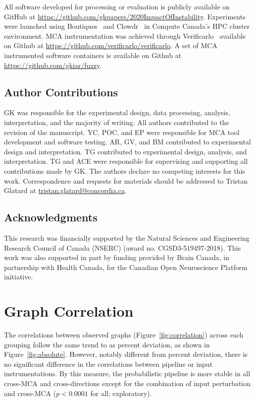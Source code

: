 \documentclass[fleqn,10pt]{SelfArx} %
\begin{document}
All software developed for processing or evaluation is publicly available on GitHub at
\url{https://github.com/gkpapers/2020ImpactOfInstability}. Experiments were launched using
Boutiques~\cite{Glatard2018-tu} and Clowdr~\cite{Kiar2019-sr} in Compute Canada's HPC cluster environment. MCA
instrumentation was achieved through Verificarlo~\cite{Denis2016-wo} available on Github at
\url{https://github.com/verificarlo/verificarlo}. A set of MCA instrumented software containers is available on Github
at \url{https://github.com/gkiar/fuzzy}.


\subsection*{Author Contributions}
GK was responsible for the experimental design, data processing, analysis, interpretation, and the majority of writing.
All authors contributed to the revision of the manuscript. YC, POC, and EP were responsible for MCA tool development
and software testing. AR, GV, and BM contributed to experimental design and interpretation. TG contributed to
experimental design, analysis, and interpretation. TG and ACE were responsible for supervising and supporting all
contributions made by GK. The authors declare no competing interests for this work. Correspondence and requests for
materials should be addressed to Tristan Glatard at \url{tristan.glatard@concordia.ca}.

\subsection*{Acknowledgments} 
This research was financially supported by the Natural Sciences and Engineering Research Council of Canada (NSERC)
(award no. CGSD3-519497-2018). This work was also supported in part by funding provided by Brain Canada, in partnership
with Health Canada, for the Canadian Open Neuroscience Platform initiative.




\beginsupplement

\clearpage
\section{Graph Correlation}
\label{supsec:correlation}
The correlations between observed graphs (Figure~\ref{fig:correlation}) across each grouping follow the same trend to
as percent deviation, as shown in Figure~\ref{fig:absolute}. However, notably different from percent deviation, there
is no significant difference in the correlations between pipeline or input instrumentations. By this measure, the
probabilistic pipeline is more stable in all cross-MCA and cross-directions except for the combination of input
perturbation and cross-MCA ($p < 0.0001$ for all; exploratory).
\end{document}
